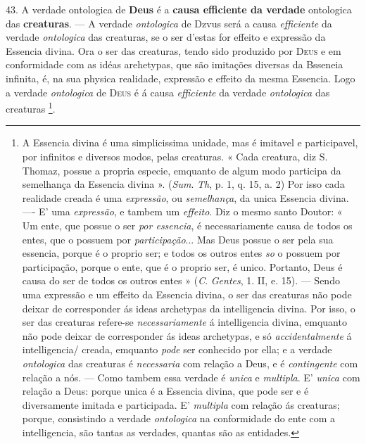  43. A verdade ontologica de \textbf{Deus} é a \textbf{causa efficiente da verdade} ontologica das \textbf{creaturas}. --- A verdade \emph{ontologica} de Dzvus será a causa \emph{efficiente} da verdade \emph{ontologica} das creaturas, se o ser d'estas for effeito e expressão da Essencia divina. Ora o ser das creaturas, tendo sido produzido por \textsc{Deus} e em conformidade com as idéas arehetypas, que são imitações diversas da Bsseneia infinita, é, na sua physica realidade, expressão e effeito da mesma Essencia. Logo a verdade \emph{ontologica} de \textsc{Deus} é á causa \emph{efficiente} da verdade \emph{ontologica} das creaturas \footnote{A Essencia divina é uma simplicissima unidade, mas é imitavel e participavel, por infinitos e diversos modos, pelas creaturas. « Cada creatura, diz S. Thomaz, possue a propria especie, emquanto de algum modo participa da semelhança da Essencia divina ». (\emph{Sum}. \emph{Th}, p. 1, q. 15, a. 2) Por isso cada realidade creada é uma \emph{expressão}, ou \emph{semelhança}, da unica Essencia divina. ---- E' uma \emph{expressão}, e tambem um \emph{effeito}. Diz o mesmo santo Doutor: « Um ente, que possue o ser \emph{por essencia}, é necessariamente causa de todos os entes, que o possuem por \emph{participação}... Mas Deus possue o ser pela sua essencia, porque é o proprio ser; e todos os outros entes \emph{so} o possuem por participação, porque o ente, que é o proprio ser, é unico. Portanto, Deus é causa do ser de todos os outros entes » (\emph{C}. \emph{Gentes}, 1. II, e. 15). --- Sendo uma expressão e um effeito da Essencia divina, o ser das creaturas não pode deixar de corresponder ás ideas archetypas da intelligencia divina. Por isso, o ser das creaturas refere-se \emph{necessariamente} á intelligencia divina, emquanto não pode deixar de corresponder ás ideas archetypas, e só \emph{accidentalmente} á intelligencia/ creada, emquanto \emph{pode} ser conhecido por ella; e a verdade \emph{ontologica} das creaturas é \emph{necessaria} com relação a Deus, e é \emph{contingente} com relação a nós. --- Como tambem essa verdade é \emph{unica} e \emph{multipla}. E' \emph{unica} com relação a Deus: porque unica é a Essencia divina, que pode ser e é diversamente imitada e participada. E' \emph{multipla} com relação ás creaturas; porque, consistindo a verdade \emph{ontologica} na conformidade do ente com a intelligencia, são tantas as verdades, quantas são as entidades.}.

